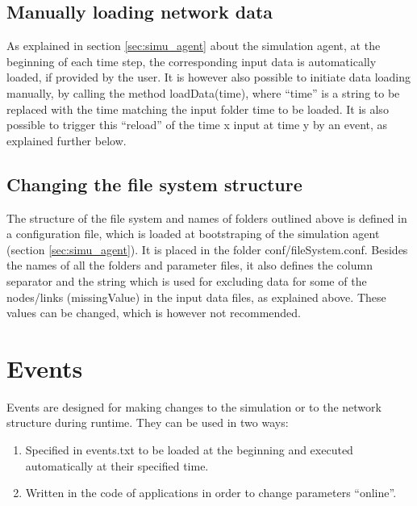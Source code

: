 \documentclass[11pt,fleqn]{book} %
\newcommand{\mainagent}{simulation agent}
\begin{document}
\subsection{Manually loading network data}
As explained in section \ref{sec:simu_agent} about the \mainagent, at the beginning of each time step, the corresponding input data is automatically loaded, if provided by the user. It is however also possible to initiate data loading manually, by calling the method loadData(time), where “time” is a string to be replaced with the time matching the input folder time to be loaded. It is also possible to trigger this “reload” of the time x input at time y by an event, as explained further below.

\subsection{Changing the file system structure}
The structure of the file system and names of folders outlined above is defined in a configuration file, which is loaded at bootstraping of the \mainagent{} (section \ref{sec:simu_agent}). It is placed in the folder conf/fileSystem.conf. Besides the names of all the folders and parameter files, it also defines the column separator and the string which is used for excluding data for some of the nodes/links (missingValue) in the input data files, as explained above. These values can be changed, which is however not recommended.


\section{Events}\label{sec:events}
Events are designed for making changes to the simulation or to the network structure during runtime. They can be used in two ways:
\begin{enumerate}
	\item Specified in events.txt to be loaded at the beginning and executed automatically at their specified time. 
	\item Written in the code of applications in order to change parameters “online”.
\end{enumerate}
\end{document}
